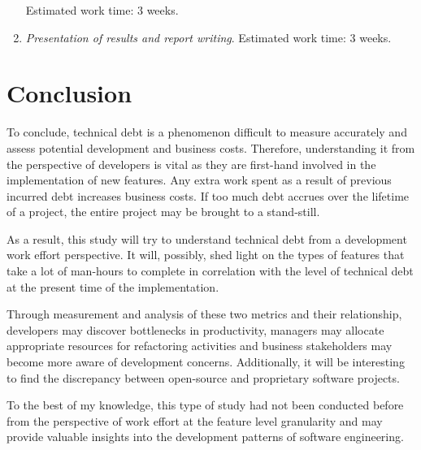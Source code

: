 \documentclass{mprop}
\begin{document}
\begin{enumerate}
	Estimated work time: 3 weeks.\\

	\item \textit{Presentation of results and report writing}.
	Estimated work time: 3 weeks.\\

\end{enumerate}

\section{Conclusion}

To conclude, technical debt is a phenomenon difficult to measure accurately and
assess potential development and business costs. Therefore, understanding it
from the perspective of developers is vital as they are first-hand involved in
the implementation of new features. Any extra work spent as a result of previous
incurred debt increases business costs. If too much debt accrues over the
lifetime of a project, the entire project may be brought to a stand-still.

As a result, this study will try to understand technical debt from a development
work effort perspective. It will, possibly, shed light on the types of features
that take a lot of man-hours to complete in correlation with the level of
technical debt at the present time of the implementation. 

Through measurement and analysis of these two metrics and their relationship,
developers may discover bottlenecks in productivity, managers may allocate
appropriate resources for refactoring activities and business stakeholders may
become more aware of development concerns. Additionally, it will be interesting
to find the discrepancy between open-source and proprietary software projects.

To the best of my knowledge, this type of study had not been conducted before
from the perspective of work effort at the feature level granularity and may
provide valuable insights into the development patterns of software engineering.

\pagebreak


\end{document}
